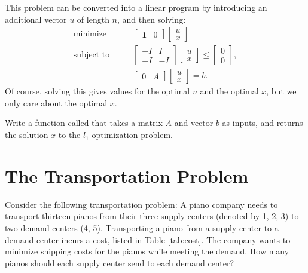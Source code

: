 This problem can be converted into a linear program by introducing an additional vector $u$ of length $n$, and then solving:
\begin{align*}
\text{minimize}\qquad 
&\begin{bmatrix}
\mathbf{1} & 0
\end{bmatrix}
\begin{bmatrix}
u \\
x
\end{bmatrix}\\
\text{subject to}\qquad
&\begin{bmatrix}
-I & I\\
-I & -I
\end{bmatrix}
\begin{bmatrix}
u \\
x
\end{bmatrix}
\leq 
\begin{bmatrix}
0\\
0
\end{bmatrix},\\
&\begin{bmatrix}
0 & A
\end{bmatrix}
\begin{bmatrix}
u \\
x
\end{bmatrix}
= 
b.
\end{align*}
Of course, solving this gives values for the optimal $u$ and the optimal $x$, but we only care about the optimal $x$.

\begin{problem}
Write a function called  that takes a matrix $A$ and vector $b$ as inputs, and returns the solution $x$ to the $l_1$ optimization problem. 
\end{problem}

\section*{The Transportation Problem}

Consider the following transportation problem:
A piano company needs to transport thirteen pianos from their three  supply centers (denoted by 1, 2, 3) to two demand centers (4, 5).
Transporting a piano from a supply center to a demand center incurs a cost, listed in Table \ref{tab:cost}.
The company wants to minimize shipping costs for the pianos while meeting the demand.
How many pianos should each supply center send to each demand center?

